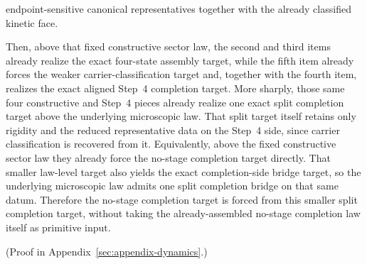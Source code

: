 \begin{theorem}
\begin{enumerate}
      endpoint-sensitive canonical representatives together with the already
      classified kinetic face.
\end{enumerate}
Then, above that fixed constructive sector law, the second and third items
already realize the exact four-state assembly target, while the fifth item
already forces the weaker carrier-classification target and, together with the
fourth item, realizes the exact aligned Step~4 completion target.
More sharply, those same four constructive and Step~4 pieces already
realize one exact split completion target above the underlying microscopic law.
That split target itself retains only rigidity and the reduced representative
data on the Step~4 side, since carrier classification is recovered from it.
Equivalently, above the fixed constructive sector law they already force the
no-stage completion target directly. That smaller law-level target also yields
the exact completion-side bridge target, so the underlying microscopic law
admits one split completion bridge on that same datum. Therefore the no-stage
completion target is forced from this smaller split completion target, without
taking the already-assembled no-stage completion law itself as primitive input.
\end{theorem}

(Proof in Appendix~\ref{sec:appendix-dynamics}.)

